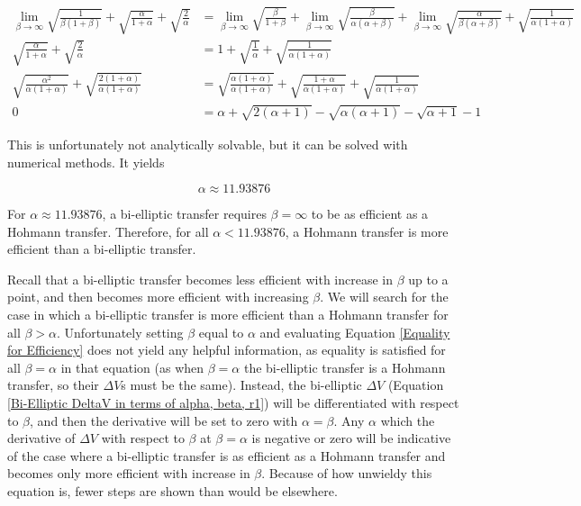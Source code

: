 \documentclass[../basicOrbitalDynamics.tex]{subfiles}
\begin{document}
\begin{align*}
    \lim_{\beta\rightarrow\infty}\sqrt{\frac{1}{\beta(1+\beta)}}+\sqrt{\frac{\alpha}{1+\alpha}}+\sqrt{\frac{2}{\alpha}} &=\lim_{\beta\rightarrow\infty}\sqrt{\frac{\beta}{1+\beta}}+\lim_{\beta\rightarrow\infty}\sqrt{\frac{\beta}{\alpha(\alpha+\beta)}}+\lim_{\beta\rightarrow\infty}\sqrt{\frac{\alpha}{\beta(\alpha+\beta)}}+\sqrt{\frac{1}{\alpha(1+\alpha)}} \\
    \sqrt{\frac{\alpha}{1+\alpha}}+\sqrt{\frac{2}{\alpha}}&=1+\sqrt{\frac{1}{\alpha}}+\sqrt{\frac{1}{\alpha(1+\alpha)}}\\
    \sqrt{\frac{\alpha^2}{\alpha(1+\alpha)}}+\sqrt{\frac{2(1+\alpha)}{\alpha(1+\alpha)}}&=\sqrt{\frac{\alpha(1+\alpha)}{\alpha(1+\alpha)}}+\sqrt{\frac{1+\alpha}{\alpha(1+\alpha)}}+\sqrt{\frac{1}{\alpha(1+\alpha)}} \\
    0&=\alpha+\sqrt{2(\alpha+1)}-\sqrt{\alpha(\alpha+1)}-\sqrt{\alpha+1}-1
\end{align*}

This is unfortunately not analytically solvable, but it can be solved with numerical methods. It yields

\[\alpha\approx11.93876\]

For $\alpha\approx11.93876$, a bi-elliptic transfer requires $\beta=\infty$ to be as efficient as a Hohmann transfer. Therefore, for all $\alpha<11.93876$, a Hohmann transfer is more efficient than a bi-elliptic transfer.

Recall that a bi-elliptic transfer becomes less efficient with increase in $\beta$ up to a point, and then becomes more efficient with increasing $\beta$. We will search for the case in which a bi-elliptic transfer is more efficient than a Hohmann transfer for all $\beta>\alpha$. Unfortunately setting $\beta$ equal to $\alpha$ and evaluating Equation  \eqref{Equality for Efficiency} does not yield any helpful information, as equality is satisfied for all $\beta=\alpha$ in that equation (as when $\beta=\alpha$ the bi-elliptic transfer is a Hohmann transfer, so their $\Delta V$s must be the same). Instead, the bi-elliptic $\Delta V$ (Equation  \eqref{Bi-Elliptic DeltaV in terms of alpha, beta, r1}) will be differentiated with respect to $\beta$, and then the derivative will be set to zero with $\alpha=\beta$. Any $\alpha$ which the derivative of $\Delta V$ with respect to $\beta$ at $\beta=\alpha$ is negative or zero will be indicative of the case where a bi-elliptic transfer is as efficient as a Hohmann transfer and becomes only more efficient with increase in $\beta$. Because of how unwieldy this equation is, fewer steps are shown than would be elsewhere.
\end{document}
